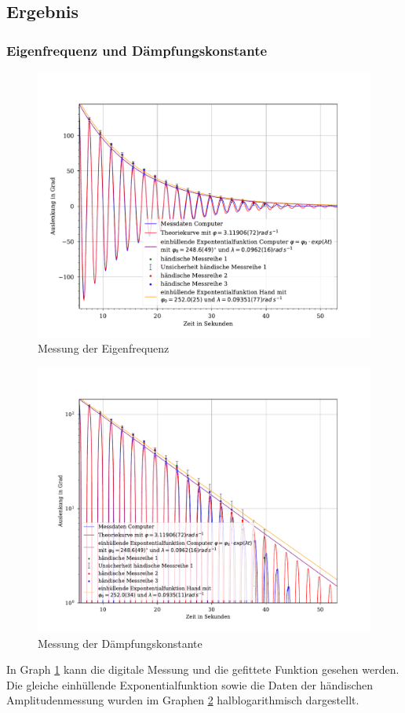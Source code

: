 \documentclass[11pt, a4paper]{article}
\begin{document}
    \subsection{Ergebnis}
    \subsubsection{Eigenfrequenz und Dämpfungskonstante}
    \begin{figure}
        \centering
        \includegraphics[width=\textwidth]{./8comp.pdf}

        \caption{Messung der Eigenfrequenz}
        \label{fig:eigenfrequenz}
    \end{figure}
    \begin{figure}
        \centering
        \includegraphics[width=\textwidth]{./9all.pdf}

        \caption{Messung der Dämpfungskonstante}
        \label{fig:daempfung}
    \end{figure}
    In Graph \ref{fig:eigenfrequenz} kann die digitale Messung und die gefittete
    Funktion gesehen werden. Die gleiche einhüllende Exponentialfunktion sowie die Daten der händischen Amplitudenmessung
    wurden im Graphen \ref{fig:daempfung} halblogarithmisch dargestellt.
    
\end{document}
